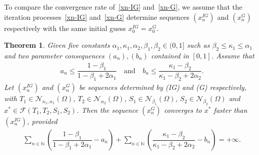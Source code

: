 \documentclass[a4paper, 11pt]{article}
\newtheorem{theorem}{Theorem}[section]
\begin{document}
To compare the convergence rate of~\eqref{xn-IG} and~\eqref{xn-G}, we assume that the iteration processes~\eqref{xn-IG} and~\eqref{xn-G} determine sequences $(x_n^{IG})$ and $(x_n^G)$ respectively with the same initial guess $x_0^{IG}=x_0^G$.
\begin{theorem}
Given five constants $\alpha_1,\kappa_1,\alpha_2,\beta_1,\beta_2\in (0,1]$ such as $\beta_2\leq \kappa_1\leq \alpha_1$ and two parameter consequences $(a_n),(b_n)$ contained in $[0,1]$. Assume that 
\begin{align}\label{cond-abn}
	a_n\leq \dfrac{1-\beta_1}{1-\beta_1+2\alpha_1} \quad \text{and} \quad b_n\leq \dfrac{\kappa_1-\beta_2}{\kappa_1-\beta_2+2\alpha_2}.
\end{align}
Let $(x_n^{IG})$ and $(x_n^G)$ be sequences determined by (IG) and (G) respectively, with $T_1\in \mathcal{N}_{\kappa_1,\alpha_1}(\Omega)$, $T_2\in \mathcal{N}_{\alpha_2}(\Omega)$, $S_1\in \mathcal{N}_{\beta_1}(\Omega)$, $S_2\in\mathcal{N}_{\beta_2}(\Omega)$ and $x^*\in \mathcal{F}(T_1,T_2,S_1,S_2)$. 
Then the sequence $(x_n^G)$ converges to $x^*$ faster than $(x_n^{IG})$, provided 
\begin{align}\label{ser}
	\displaystyle\sum_{n \in \mathbb{N}}\left(\dfrac{1-\beta_1}{1-\beta_1+2\alpha_1}-a_n\right) + \displaystyle\sum_{n \in \mathbb{N}}\left(\dfrac{\kappa_1-\beta_2}{\kappa_1-\beta_2+2\alpha_2}-b_n\right)=+\infty.
\end{align} 
\end{theorem}
\end{document}

